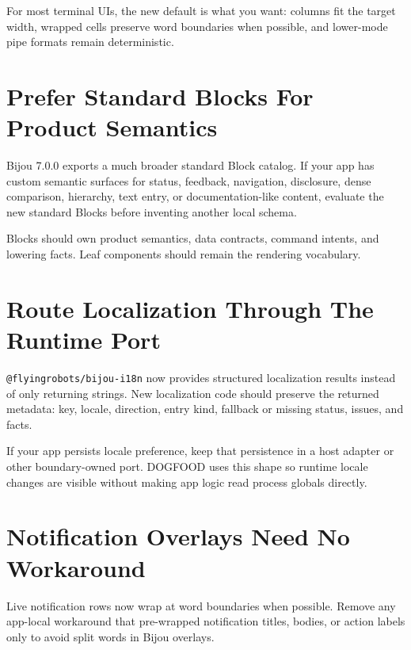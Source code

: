 For most terminal UIs, the new default is what you want: columns fit the target width, wrapped cells preserve word boundaries when possible, and lower-mode pipe formats remain deterministic.

\section{Prefer Standard Blocks For Product Semantics}\label{record-270-prefer-standard-blocks-for-product-semantics}

Bijou 7.0.0 exports a much broader standard Block catalog. If your app has custom semantic surfaces for status, feedback, navigation, disclosure, dense comparison, hierarchy, text entry, or documentation-like content, evaluate the new standard Blocks before inventing another local schema.

Blocks should own product semantics, data contracts, command intents, and lowering facts. Leaf components should remain the rendering vocabulary.

\section{Route Localization Through The Runtime Port}\label{record-270-route-localization-through-the-runtime-port}

\texttt{@\allowbreak{}f\allowbreak{}l\allowbreak{}y\allowbreak{}i\allowbreak{}n\allowbreak{}g\allowbreak{}r\allowbreak{}o\allowbreak{}b\allowbreak{}o\allowbreak{}t\allowbreak{}s\allowbreak{}/\allowbreak{}b\allowbreak{}i\allowbreak{}j\allowbreak{}o\allowbreak{}u\allowbreak{}-\allowbreak{}i\allowbreak{}1\allowbreak{}8\allowbreak{}n} now provides structured localization results instead of only returning strings. New localization code should preserve the returned metadata: key, locale, direction, entry kind, fallback or missing status, issues, and facts.

If your app persists locale preference, keep that persistence in a host adapter or other boundary-owned port. DOGFOOD uses this shape so runtime locale changes are visible without making app logic read process globals directly.

\section{Notification Overlays Need No Workaround}\label{record-270-notification-overlays-need-no-workaround}

Live notification rows now wrap at word boundaries when possible. Remove any app-local workaround that pre-wrapped notification titles, bodies, or action labels only to avoid split words in Bijou overlays.

